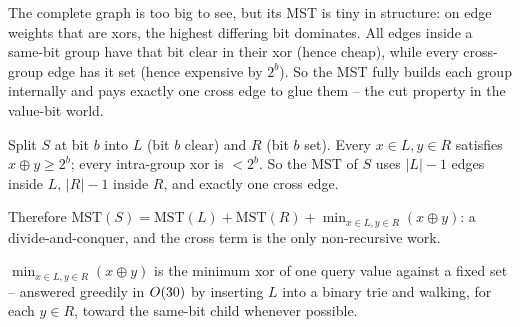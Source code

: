 The complete graph is too big to see, but its MST is tiny in structure: on edge
weights that are xors, the highest differing bit dominates.  All edges inside a
same-bit group have that bit clear in their xor (hence cheap), while every
cross-group edge has it set (hence expensive by \(2^b\)).  So the MST fully builds
each group internally and pays exactly one cross edge to glue them -- the cut
property in the value-bit world.

\begin{observation}
Split \(S\) at bit \(b\) into \(L\) (bit \(b\) clear) and \(R\) (bit \(b\) set).
Every \(x\in L, y\in R\) satisfies \(x\oplus y \ge 2^b\); every intra-group xor is
\(< 2^b\).  So the MST of \(S\) uses \(|L|-1\) edges inside \(L\), \(|R|-1\) inside
\(R\), and exactly one cross edge.
\end{observation}
\begin{observation}
Therefore \(\mathrm{MST}(S)=\mathrm{MST}(L)+\mathrm{MST}(R)+\min_{x\in L,y\in R}
(x\oplus y)\): a divide-and-conquer, and the cross term is the only non-recursive
work.
\end{observation}
\begin{observation}
\(\min_{x\in L,y\in R}(x\oplus y)\) is the minimum xor of one query value against
a fixed set -- answered greedily in \(O(30)\) by inserting \(L\) into a binary
trie and walking, for each \(y\in R\), toward the same-bit child whenever possible.
\end{observation}

\begin{thinkbox}
\end{thinkbox}


